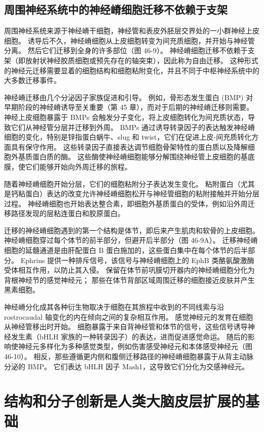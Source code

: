 \subsection{周围神经系统中的神经嵴细胞迁移不依赖于支架}
周围神经系统来源于神经嵴干细胞，神经管和表皮外胚层交界处的一小群神经上皮细胞。 诱导后不久，神经嵴细胞从上皮细胞转变为间充质细胞，并开始与神经管分离。 然后它们迁移到全身的许多部位（图 46-9）。 神经嵴细胞迁移不依赖于支架（即放射状神经胶质细胞或预先存在的轴突束），因此称为自由迁移。 这种形式的神经元迁移需要显着的细胞结构和细胞粘附变化，并且不同于中枢神经系统中的大多数迁移事件。

神经嵴迁移由几个分泌因子家族促进和引导。 例如，骨形态发生蛋白 (BMP) 对早期阶段的神经嵴诱导至关重要（第 45 章），而对于后期的神经嵴迁移则需要。 神经上皮细胞暴露于 BMPs 会触发分子变化，将上皮细胞转化为间充质状态，导致它们从神经管分层并迁移到外周。 BMPs 通过诱导转录因子的表达触发神经嵴细胞的变化，特别是锌指蛋白蜗牛、slug 和 twist，它们在促进上皮-间充质转化方面具有保守作用。 这些转录因子直接表达调节细胞骨架特性的蛋白质以及降解细胞外基质蛋白质的酶。 这些酶使神经嵴细胞能够分解围绕神经管上皮细胞的基底膜，使它们能够开始向外周迁移的旅程。

随着神经嵴细胞开始分层，它们的细胞粘附分子表达发生变化。 粘附蛋白（尤其是钙粘蛋白）表达的改变允许神经嵴细胞松开与神经管细胞的粘附接触并开始分层过程。 神经嵴细胞也开始表达整合素，即细胞外基质蛋白的受体，例如沿外周迁移路径发现的层粘连蛋白和胶原蛋白。

迁移的神经嵴细胞遇到的第一个结构是体节，即后来产生肌肉和软骨的上皮细胞。 神经嵴细胞穿过每个体节的前半部分，但避开后半部分（图 46-9A）。 迁移神经嵴细胞的延髓通道是由肝配蛋白 B 蛋白施加的，这些蛋白集中在每个体节的后半部分。 Ephrins 提供一种排斥信号，该信号与神经嵴细胞上的 EphB 类酪氨酸激酶受体相互作用，以防止其入侵。 保留在体节前巩膜切开器内的神经嵴细胞分化为背根神经节的感觉神经元； 那些在体节背部区域周围迁移的细胞接近皮肤并产生黑素细胞。

神经嵴分化成其各种衍生物取决于细胞在其旅程中收到的不同线索与沿 rostrocaudal 轴变化的内在倾向之间的复杂相互作用。 感觉神经元的发育在细胞从神经管移出时开始。 细胞暴露于来自背神经管和体节的信号，这些信号诱导神经发生素（bHLH 家族的一种转录因子）的表达，进而促进感觉命运。 随后的影响使神经元多样化为多种感觉类型，例如伤害感受神经元和本体感受神经元（图 46-10）。 相反，那些遵循更内侧和腹侧迁移路径的神经嵴细胞暴露于从背主动脉分泌的 BMP。 它们表达 bHLH 因子 Mash1，这导致它们分化为交感神经元。


\section{结构和分子创新是人类大脑皮层扩展的基础}

